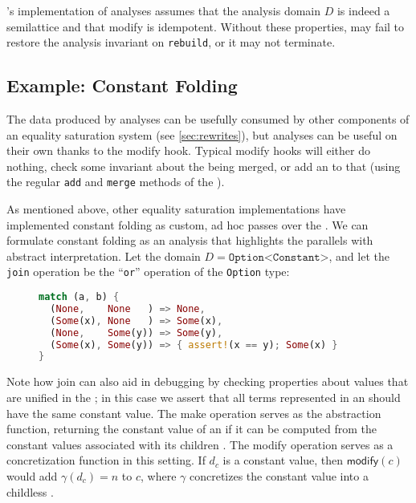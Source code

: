 \Egg's implementation of \eclass analyses assumes that the analysis domain $D$
  is indeed a semilattice and that \textsf{modify} is idempotent.
Without these properties, \egg may fail to restore the analysis invariant on
  \texttt{rebuild}, or it may not terminate.

\subsection{Example: Constant Folding}

The data produced by \eclass analyses can be
  usefully consumed by other components of an equality saturation system
  (see \autoref{sec:rewrites}),
  but \eclass analyses can be useful on their own thanks to the
  \textsf{modify} hook.
Typical \textsf{modify} hooks will either do nothing, check some invariant about
  the \eclasses being merged, or add an \enode to that \eclass
  (using the regular \texttt{add} and \texttt{merge} methods of the \egraph).

As mentioned above, other equality saturation implementations have implemented
  constant folding as custom, ad hoc passes over the \egraph.
We can formulate constant folding as an \eclass analysis that highlights the
  parallels with abstract interpretation.
Let the domain $D = \texttt{Option<Constant>}$, and let the \texttt{join}
  operation be the ``\texttt{or}'' operation of the \texttt{Option} type:
\begin{figure}[h!]
\begin{lstlisting}[language=Rust, basicstyle=\ttfamily\footnotesize, xleftmargin=35mm]
match (a, b) {
  (None,    None   ) => None,
  (Some(x), None   ) => Some(x),
  (None,    Some(y)) => Some(y),
  (Some(x), Some(y)) => { assert!(x == y); Some(x) }
}
\end{lstlisting}
\end{figure}
Note how \textsf{join} can also aid in debugging by checking properties about
  values that are unified in the \egraph;
  in this case we assert that all terms represented in an \eclass should have
  the same constant value.
The \textsf{make} operation serves as the abstraction function, returning the
  constant value of an \enode if it can be computed from the constant values
  associated with its children \eclasses.
The \textsf{modify} operation serves as a concretization function in this
  setting.
If $d_{c}$ is a constant value, then $\textsf{modify}(c)$ would add
  $\gamma(d_{c}) = n$ to $c$, where $\gamma$ concretizes the constant value into
  a childless \enode.

